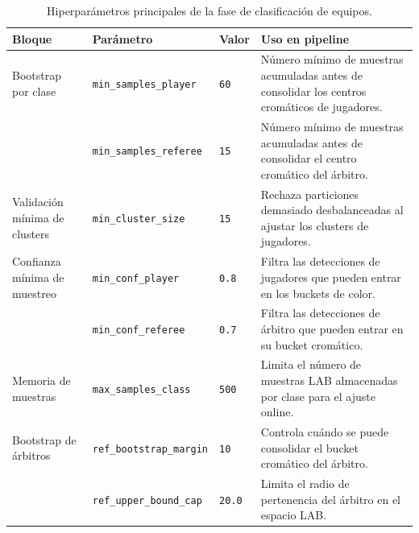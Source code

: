 \begin{table}[htbp]
\centering
\scriptsize
\setlength{\tabcolsep}{3pt}
\renewcommand{\arraystretch}{1.12}
\begin{tabularx}{\textwidth}{
>{\raggedright\arraybackslash}p{2.7cm}
>{\raggedright\arraybackslash}p{3.3cm}
>{\raggedright\arraybackslash}p{1.7cm}
>{\raggedright\arraybackslash}X
}
\toprule
\textbf{Bloque} & \textbf{Parámetro} & \textbf{Valor} & \textbf{Uso en pipeline} \\
\midrule

Bootstrap por clase &
\texttt{min\_samples\_player} &
\texttt{60} &
Número mínimo de muestras acumuladas antes de consolidar los centros cromáticos de jugadores. \\

&
\texttt{min\_samples\_referee} &
\texttt{15} &
Número mínimo de muestras acumuladas antes de consolidar el centro cromático del árbitro. \\

\midrule

Validación mínima de clusters &
\texttt{min\_cluster\_size} &
\texttt{15} &
Rechaza particiones demasiado desbalanceadas al ajustar los clusters de jugadores. \\

\midrule

Confianza mínima de muestreo &
\texttt{min\_conf\_player} &
\texttt{0.8} &
Filtra las detecciones de jugadores que pueden entrar en los buckets de color. \\

&
\texttt{min\_conf\_referee} &
\texttt{0.7} &
Filtra las detecciones de árbitro que pueden entrar en su bucket cromático. \\

\midrule

Memoria de muestras &
\texttt{max\_samples\_class} &
\texttt{500} &
Limita el número de muestras LAB almacenadas por clase para el ajuste online. \\

\midrule

Bootstrap de árbitros &
\texttt{ref\_bootstrap\_margin} &
\texttt{10} &
Controla cuándo se puede consolidar el bucket cromático del árbitro. \\

&
\texttt{ref\_upper\_bound\_cap} &
\texttt{20.0} &
Limita el radio de pertenencia del árbitro en el espacio LAB. \\

\bottomrule
\end{tabularx}

\caption[Hiperparámetros de clasificación de equipos]{
Hiperparámetros principales de la fase de clasificación de equipos.}
\label{tab:clasificacion_equipos}
\end{table}


